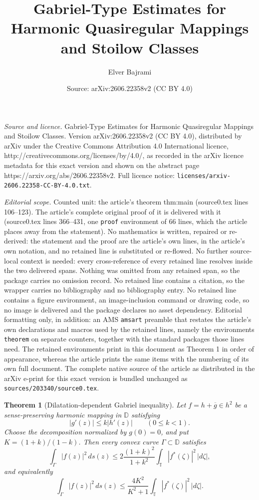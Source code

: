 \documentclass[10pt,a4paper]{amsart}
\title{Gabriel-Type Estimates for Harmonic Quasiregular Mappings and Stoilow Classes}
\author{Elver Bajrami}
\date{Source: arXiv:2606.22358v2 (CC BY 4.0)}
\newtheorem{theorem}{Theorem}
\newcommand{\D}{\mathbb D}
\newcommand{\T}{\mathbb T}
\newcommand{\ds}{\,ds}
\begin{document}
\maketitle

\noindent\emph{Source and licence.} Gabriel-Type Estimates for Harmonic Quasiregular Mappings and Stoilow Classes. Version arXiv:2606.22358v2 (CC BY 4.0), distributed by arXiv under the Creative Commons Attribution 4.0 International licence, http://creativecommons.org/licenses/by/4.0/, as recorded in the arXiv licence metadata for this exact version and shown on the abstract page https://arxiv.org/abs/2606.22358v2. Full licence notice: \texttt{licenses/arxiv-2606.22358-CC-BY-4.0.txt}.\par\smallskip

\noindent\textit{Editorial scope.} Counted unit: the article's theorem thm:main (source0.tex lines 106--123). The article's complete original proof of it is delivered with it (source0.tex lines 366--431, one \texttt{proof} environment of 66 lines, which the article places away from the statement). No mathematics is written, repaired or re-derived: the statement and the proof are the article's own lines, in the article's own notation, and no retained line is substituted or re-flowed.  No further source-local context is needed: every cross-reference of every retained line resolves inside the two delivered spans.  Nothing was omitted from any retained span, so the package carries no omission record.  No retained line contains a citation, so the wrapper carries no bibliography and no bibliography entry.  No retained line contains a figure environment, an image-inclusion command or drawing code, so no image is delivered and the package declares no asset dependency.  Editorial formatting only, in addition: an AMS \texttt{amsart} preamble that restates the article's own declarations and macros used by the retained lines, namely the environments \texttt{theorem} on separate counters, together with the standard packages those lines need.  The retained environments print in this document as Theorem 1 in order of appearance, whereas the article prints the same items with the numbering of its own full document.  The complete native source of the article as distributed in the arXiv e-print for this exact version is bundled unchanged as \texttt{sources/203340/source0.tex}.
\begin{theorem}[Dilatation-dependent Gabriel inequality]\label{thm:main}
Let $f=h+\overline g\in h^2$ be a sense-preserving harmonic mapping in $\D$ satisfying
\[
   |g'(z)|\le k|h'(z)|\qquad (0\le k<1).
\]
Choose the decomposition normalized by $g(0)=0$, and put $K=(1+k)/(1-k)$. Then every convex curve $\Gamma\subset\D$ satisfies
\begin{equation}\label{eq:main-k}
   \int_\Gamma |f(z)|^2\ds(z)
   \le 2\frac{(1+k)^2}{1+k^2}
      \int_\T |f^*(\zeta)|^2\,|d\zeta|,
\end{equation}
and equivalently
\begin{equation}\label{eq:main-K}
   \int_\Gamma |f(z)|^2\ds(z)
   \le \frac{4K^2}{K^2+1}
      \int_\T |f^*(\zeta)|^2\,|d\zeta|.
\end{equation}
\end{theorem}
\end{document}

